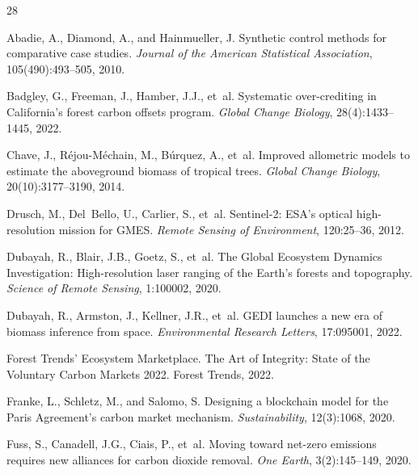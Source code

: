 \begin{thebibliography}{28}

Abadie, A., Diamond, A., and Hainmueller, J.
\newblock Synthetic control methods for comparative case studies.
\newblock \emph{Journal of the American Statistical Association},
  105(490):493--505, 2010.

Badgley, G., Freeman, J., Hamber, J.J., et~al.
\newblock Systematic over-crediting in California's forest carbon offsets
  program.
\newblock \emph{Global Change Biology}, 28(4):1433--1445, 2022.

Chave, J., R{\'e}jou-M{\'e}chain, M., B{\'u}rquez, A., et~al.
\newblock Improved allometric models to estimate the aboveground biomass of
  tropical trees.
\newblock \emph{Global Change Biology}, 20(10):3177--3190, 2014.

Drusch, M., Del~Bello, U., Carlier, S., et~al.
\newblock Sentinel-2: ESA's optical high-resolution mission for GMES.
\newblock \emph{Remote Sensing of Environment}, 120:25--36, 2012.

Dubayah, R., Blair, J.B., Goetz, S., et~al.
\newblock The Global Ecosystem Dynamics Investigation: High-resolution laser
  ranging of the Earth's forests and topography.
\newblock \emph{Science of Remote Sensing}, 1:100002, 2020.

Dubayah, R., Armston, J., Kellner, J.R., et~al.
\newblock GEDI launches a new era of biomass inference from space.
\newblock \emph{Environmental Research Letters}, 17:095001, 2022.

Forest Trends' Ecosystem Marketplace.
\newblock The Art of Integrity: State of the Voluntary Carbon Markets 2022.
\newblock Forest Trends, 2022.

Franke, L., Schletz, M., and Salomo, S.
\newblock Designing a blockchain model for the Paris Agreement's carbon market
  mechanism.
\newblock \emph{Sustainability}, 12(3):1068, 2020.

Fuss, S., Canadell, J.G., Ciais, P., et~al.
\newblock Moving toward net-zero emissions requires new alliances for carbon
  dioxide removal.
\newblock \emph{One Earth}, 3(2):145--149, 2020.


\end{thebibliography}
